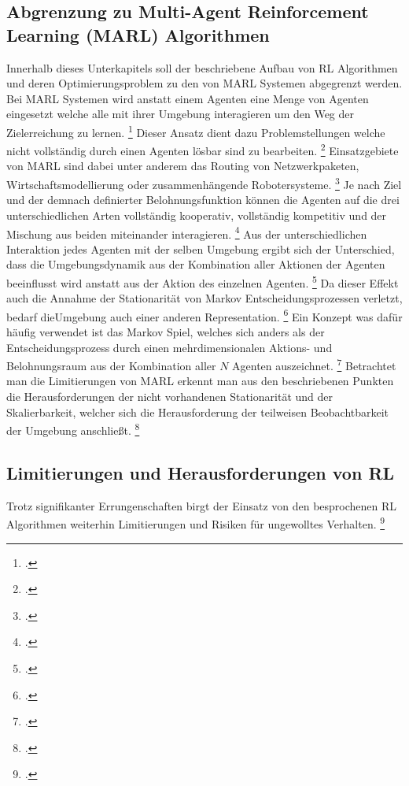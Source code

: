 \subsection{Abgrenzung zu Multi-Agent Reinforcement Learning (MARL) Algorithmen}
Innerhalb dieses Unterkapitels soll der beschriebene Aufbau von RL Algorithmen und deren Optimierungsproblem zu den von MARL Systemen abgegrenzt werden.
Bei MARL Systemen wird anstatt einem Agenten eine Menge von Agenten eingesetzt welche alle mit ihrer Umgebung interagieren um den Weg der Zielerreichung zu lernen. \footcite[Vgl.][S. 6]{Wong.2022}
Dieser Ansatz dient dazu Problemstellungen welche nicht vollständig durch einen Agenten lösbar sind zu bearbeiten. \footcite[Vgl.][S. 1]{Canese.2021}
Einsatzgebiete von MARL sind dabei unter anderem das Routing von Netzwerkpaketen, Wirtschaftsmodellierung oder zusammenhängende Robotersysteme. \footcite[Vgl.][S. 1]{Canese.2021}
Je nach Ziel und der demnach definierter Belohnungsfunktion können die Agenten auf die drei unterschiedlichen Arten vollständig kooperativ, vollständig kompetitiv und der Mischung aus beiden miteinander interagieren. \footcite[Vgl.][S. 8f.]{Canese.2021}
Aus der unterschiedlichen Interaktion jedes Agenten mit der selben Umgebung ergibt sich der Unterschied, dass die Umgebungsdynamik aus der Kombination aller Aktionen der Agenten beeinflusst wird anstatt aus der Aktion des einzelnen Agenten. \footcite[Vgl.][S. 2]{Wong.2022}
Da dieser Effekt auch die Annahme der Stationarität von Markov Entscheidungsprozessen verletzt, bedarf dieUmgebung  auch einer anderen Representation. \footcite[Vgl.][S. 6]{Wong.2022}
Ein Konzept was dafür häufig verwendet ist das Markov Spiel, welches sich anders als der Entscheidungsprozess durch einen mehrdimensionalen Aktions- und Belohnungsraum aus der Kombination aller $N$ Agenten auszeichnet. \footcite[Vgl.][S. 4]{Canese.2021}
Betrachtet man die Limitierungen von MARL erkennt man aus den beschriebenen Punkten die Herausforderungen der nicht vorhandenen Stationarität und der Skalierbarkeit, welcher sich die Herausforderung der teilweisen Beobachtbarkeit der Umgebung anschließt. \footcite[Vgl.][S. 9ff.]{Canese.2021}

\subsection{Limitierungen und Herausforderungen von RL}
Trotz signifikanter Errungenschaften birgt der Einsatz von den besprochenen RL Algorithmen weiterhin Limitierungen und Risiken für ungewolltes Verhalten. \footcite[Vgl.][S. 7]{Li.2019}

